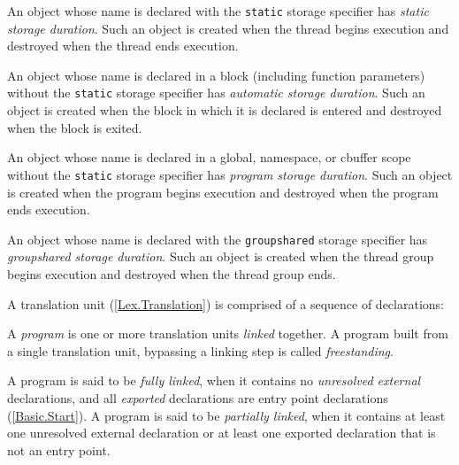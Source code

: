 
\p An object whose name is declared with the \texttt{static} storage specifier
has \textit{static storage duration}. Such an object is created when the thread
begins execution and destroyed when the thread ends execution.


\p An object whose name is declared in a block (including function parameters)
without the \texttt{static} storage specifier has \textit{automatic storage
duration}. Such an object is created when the block in which it is declared is
entered and destroyed when the block is exited.


\p An object whose name is declared in a global, namespace, or cbuffer scope
without the \texttt{static} storage specifier has \textit{program storage
duration}. Such an object is created when the program begins execution and
destroyed when the program ends execution.


\p An object whose name is declared with the \texttt{groupshared} storage
specifier has \textit{groupshared storage duration}. Such an object is created
when the thread group begins execution and destroyed when the thread group ends.


\p A translation unit (\ref{Lex.Translation}) is comprised of a sequence of
declarations:

\begin{grammar}
  \br
\end{grammar}

\p A \textit{program} is one or more translation units \textit{linked} together.
A program built from a single translation unit, bypassing a linking step is
called \textit{freestanding}.

\p A program is said to be \textit{fully linked}, when it contains no
\textit{unresolved external} declarations, and all \textit{exported}
declarations are entry point declarations (\ref{Basic.Start}). A program is said
to be \textit{partially linked}, when it contains at least one unresolved
external declaration or at least one exported declaration that is not an entry
point.

